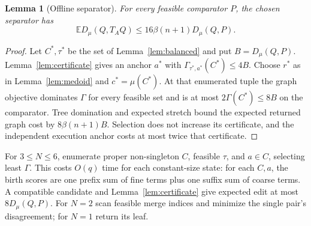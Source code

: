 \documentclass[11pt]{article}
\newtheorem{lemma}[theorem]{Lemma}
\theoremstyle{definition}
\newcommand{\E}{\mathbb E}
\begin{document}
\begin{lemma}[Offline separator]\label{lem:slow-separator}
For every feasible comparator $P$, the chosen separator has
\[
 \E D_\mu(Q,T_AQ)\le16\beta(n+1)D_\mu(Q,P).
\]
\end{lemma}
\begin{proof}
Let $C^*,\tau^*$ be the set of Lemma~\ref{lem:balanced} and put
$B=D_\mu(Q,P)$. Lemma~\ref{lem:certificate} gives an anchor $a^*$ with
$\Gamma_{\tau^*,a^*}(C^*)\le4B$. Choose $r^*$ as in
Lemma~\ref{lem:medoid} and $c^*=\mu(C^*)$.
At that enumerated tuple the graph objective dominates $\Gamma$ for
every feasible set and is at most $2\Gamma(C^*)\le8B$ on the comparator.
Tree domination and expected stretch bound the expected returned
graph cost by $8\beta(n+1)B$. Selection does not increase its certificate,
and the independent execution anchor costs at most twice that certificate.
\end{proof}

For $3\le N\le6$, enumerate proper non-singleton $C$, feasible $\tau$,
and $a\in C$, selecting least $\Gamma$. This costs $O(q)$ time for each
constant-size state: for each $C,a$, the birth scores are one prefix
sum of fine terms plus one suffix sum of coarse terms.
A compatible candidate and Lemma~\ref{lem:certificate} give expected edit
at most $8D_\mu(Q,P)$. For $N=2$ scan feasible merge indices and minimize
the single pair's disagreement; for $N=1$ return its leaf.
\end{document}

